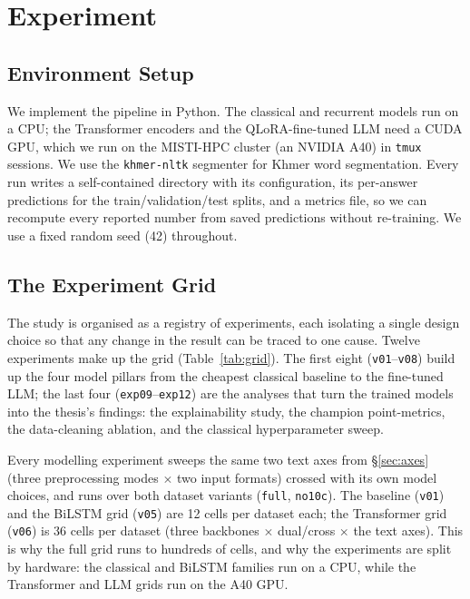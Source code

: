 \chapter{Experiment}
\label{ch:experiments}

\section{Environment Setup}
\label{sec:env}
We implement the pipeline in Python. The classical and recurrent models run on a CPU; the Transformer
encoders and the QLoRA-fine-tuned LLM need a CUDA GPU, which we run on the MISTI-HPC cluster (an NVIDIA
A40) in \texttt{tmux} sessions. We use the
\texttt{khmer-nltk} segmenter for Khmer word segmentation. Every run writes a self-contained directory
with its configuration, its per-answer predictions for the train/validation/test splits, and a metrics
file, so we can recompute every reported number from saved predictions without re-training. We use a
fixed random seed (42) throughout.

\section{The Experiment Grid}
\label{sec:grid}
The study is organised as a registry of experiments, each isolating a single design choice so that any
change in the result can be traced to one cause. Twelve experiments make up the grid
(Table~\ref{tab:grid}). The first eight (\texttt{v01}--\texttt{v08}) build up the four model pillars
from the cheapest classical baseline to the fine-tuned LLM; the last four (\texttt{exp09}--\texttt{exp12})
are the analyses that turn the trained models into the thesis's findings: the explainability study, the
champion point-metrics, the data-cleaning ablation, and the classical hyperparameter sweep.

Every modelling experiment sweeps the same two text axes from \S\ref{sec:axes} (three preprocessing
modes $\times$ two input formats) crossed with its own model choices, and runs over both dataset
variants (\texttt{full}, \texttt{no10c}). The baseline (\texttt{v01}) and the
BiLSTM grid (\texttt{v05}) are 12 cells per dataset each; the Transformer grid (\texttt{v06}) is 36
cells per dataset (three backbones $\times$ dual/cross $\times$ the text axes). This is why the full
grid runs to hundreds of cells, and why the experiments are split by hardware: the classical and BiLSTM
families run on a CPU, while the Transformer and LLM grids run on the A40 GPU.

